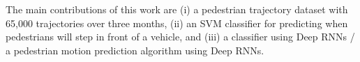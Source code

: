 The main contributions of this work are 
(i) a pedestrian trajectory dataset with 65,000 trajectories over three months, (ii) an SVM classifier for predicting when pedestrians will step in front of a vehicle, and (iii)  a classifier using Deep RNNs / a pedestrian motion prediction algorithm using Deep RNNs.












